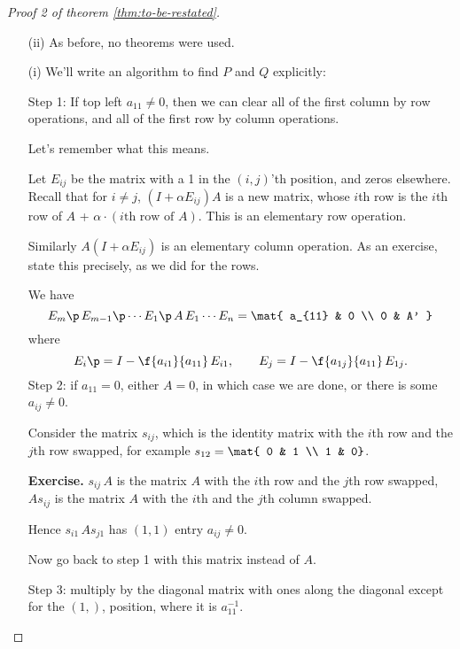 \begin{proof}
	[Proof 2 of theorem \ref{thm:to-be-restated}] %
	\mbox{}
	\begin{enumerate}
		\shortskip
		\item [(ii)] As before, no theorems were used.
		\item [(i)] We'll write an algorithm to find $P$ and $Q$ explicitly:
		
		Step 1: If top left $a_{11}\neq 0$, then we can clear all of the first column by row operations, and all of the first row by column operations. %

		Let's remember what this means. 
		
Let $E_{ij}$ be the matrix with a 1 in the $(i,j)$'th position, and zeros elsewhere.
		Recall that for $i\neq j$, $\left( I+\alpha E_{ij} \right)A$ is a new matrix, whose $i$th row is the $i$th row of $A$ + $\alpha\cdot\left( i\text{th row of } A \right)$. This is an elementary row operation. %
		
		Similarly $A\left( I+\alpha E_{ij} \right)$ is an elementary column operation. As an exercise, state this precisely, as we did for the rows. %
		
			\pagebreak
		
		We have
		\begin{equation*}
			E_m\p \,E_{m-1}\p \cdots E_1\p \,A \,E_1 \cdots E_n
			=
			\mat{
				a_{11} & 0 \\
				0 & A'
			}
		\end{equation*}
		where
		\begin{equation*}
			E_i\p = I-\f{a_{i1}}{a_{11}} \, E_{i1}, \qquad
			E_j = I- \f{a_{1j}}{a_{11}} \, E_{1j}.
		\end{equation*}
		Step 2: if $a_{11}=0$, either $A=0$, in which case we are done, or there is some $a_{ij}\neq 0$.
		
		Consider the matrix $s_{ij}$, which is the identity matrix with the $i$th row and the $j$th row swapped, for example $s_{12} = \mat{ 0 & 1 \\ 1 &  0}$. %
		
		\textbf{Exercise.} $s_{ij}\,A$ is the matrix $A$ with the $i$th row and the $j$th row swapped, $A s_{ij}$ is the matrix $A$ with the $i$th  and the $j$th column swapped. %

		Hence $s_{i1} \, A s_{j1}$ has $(1,1)$ entry $a_{ij}\neq 0$.

		Now go back to step 1 with this matrix instead of $A$.
		
		Step 3: multiply by the diagonal matrix with ones along the diagonal except for the $(1,)$, position, where it is
$a_{11}^{-1}$. %


\end{enumerate}
\end{proof}
